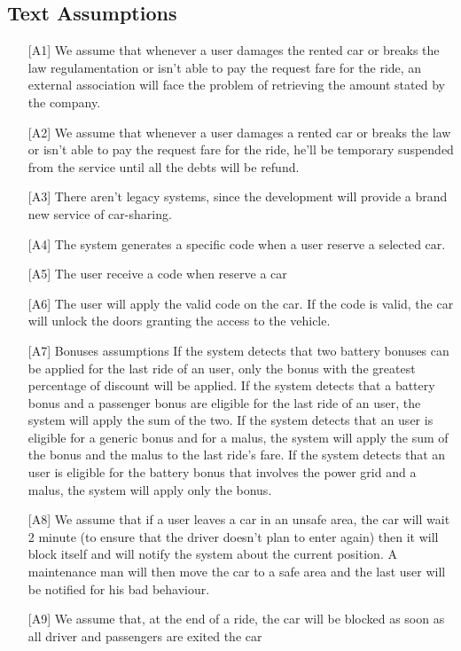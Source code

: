 \documentclass[10pt, a4paper,titlepage]{article}
\begin{document}
\subsection{Text Assumptions}
\begin{itemize}
\item [{[A1]}] We assume that whenever a user damages the rented car or breaks the law regulamentation or isn't able to pay the request fare for the ride, an external association will face the problem of retrieving the amount stated by the company.
\item [{[A2]}] We assume that whenever a user damages a rented car or breaks the law or isn't able to pay the request fare for the ride, he'll be temporary suspended from the service until all the debts will be refund.
\item [{[A3]}] There aren't legacy systems, since the development will provide a brand new service of car-sharing.
\item [{[A4]}] The system generates a specific code when a user reserve a selected car.
\item [{[A5]}] The user receive a code when reserve a car
\item [{[A6]}] The user will apply the valid code on the car. If the code is valid, the car will unlock the doors granting the access to the vehicle.
\item [{[A7]}] Bonuses assumptions
\subitem [{A7.1}] If the system detects that two battery bonuses can be applied for the last ride of an user, only the bonus with the greatest percentage of discount will be applied.
\subitem [{A7.2}] If the system detects that a battery bonus and a passenger bonus are eligible for the last ride of an user, the system will apply the sum of the two.
\subitem [{A7.3}] If the system detects that an user is eligible for a generic bonus and for a malus, the system will apply the sum of the bonus and the malus to the last ride's fare.
\subitem [{A7.4}] If the system detects that an user is eligible for the battery bonus that involves the power grid and a malus, the system will apply only the bonus.
\item [{[A8]}] We assume that if a user leaves a car in an unsafe area, the car will wait 2 minute (to ensure that the driver doesn't plan to enter again) then it will block itself and will notify the system about the current position. A maintenance man will then move the car to a safe area and the last user will be notified for his bad behaviour.
\item [{[A9]}] We assume that, at the end of a ride, the car will be blocked as soon as all driver and passengers are exited the car

\end{itemize}
\end{document}
